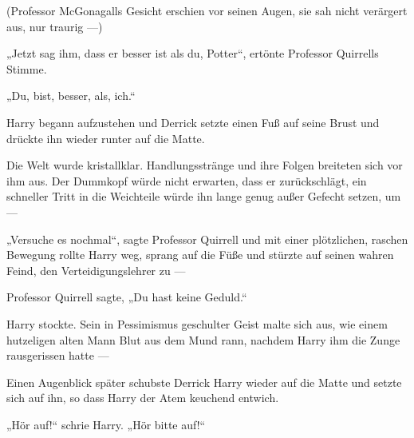 (Professor McGonagalls Gesicht erschien vor seinen Augen, sie sah nicht verärgert aus, nur traurig —)

„Jetzt sag ihm, dass er besser ist als du, Potter“, ertönte Professor Quirrells Stimme.

„Du, bist, besser, als, ich.“

Harry begann aufzustehen und Derrick setzte einen Fuß auf seine Brust und drückte ihn wieder runter auf die Matte.

Die Welt wurde kristallklar. Handlungsstränge und ihre Folgen breiteten sich vor ihm aus. Der Dummkopf würde nicht erwarten, dass er zurückschlägt, ein schneller Tritt in die Weichteile würde ihn lange genug außer Gefecht setzen, um —

„Versuche es nochmal“, sagte Professor Quirrell und mit einer plötzlichen, raschen Bewegung rollte Harry weg, sprang auf die Füße und stürzte auf seinen wahren Feind, den Verteidigungslehrer zu —

Professor Quirrell sagte,
„Du hast keine Geduld.“

Harry stockte. Sein in Pessimismus geschulter Geist malte sich aus, wie einem hutzeligen alten Mann Blut aus dem Mund rann, nachdem Harry ihm die Zunge rausgerissen hatte —

Einen Augenblick später schubste Derrick Harry wieder auf die Matte und setzte sich auf ihn, so dass Harry der Atem keuchend entwich.

„Hör auf!“ schrie Harry.
„Hör bitte auf!“

